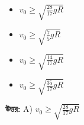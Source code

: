 \documentclass[12pt, a4paper]{article}
\begin{document}
\begin{itemize}[label={}, leftmargin=1cm, itemsep=0.5em]
    \item[\textbf{A)}] $v_0 \ge \sqrt{\frac{28}{17} g R}$
    \item[\textbf{B)}] $v_0 \ge \sqrt{\frac{7}{5} g R}$
    \item[\textbf{C)}] $v_0 \ge \sqrt{\frac{14}{17} g R}$
    \item[\textbf{D)}] $v_0 \ge \sqrt{\frac{35}{17} g R}$
\end{itemize}

\vspace{0.5em}
\begin{tcolorbox}[answerbox]
    \textbf{\color{success} উত্তর:} A) $v_0 \ge \sqrt{\frac{28}{17} g R}$
\end{tcolorbox}
\vspace{1em}
\end{document}
